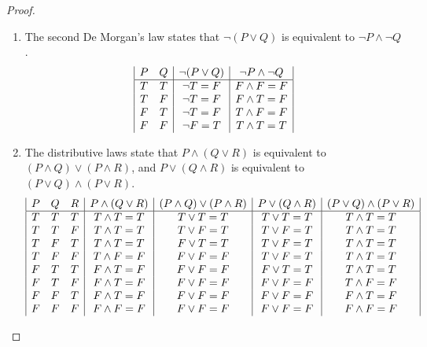 \documentclass[12pt]{amsart}
\theoremstyle{definition}
\theoremstyle{remark}
\begin{document}
\begin{proof}
\hfill
\begin{enumerate}
	\item The second De Morgan's law states that $\neg (P \vee Q)$ is equivalent to $\neg P \wedge \neg Q$.
	\begin{equation*}
		\begin{array}{| c c | c | c |}
			P & Q & \neg (P \vee Q) & \neg P \wedge \neg Q \\
			\hline
			T & T & \neg T = F & F \wedge F = F \\
			T & F & \neg T = F & F \wedge T = F \\
			F & T & \neg T = F & T \wedge F = F \\
			F & F & \neg F = T & T \wedge T = T
		\end{array}
	\end{equation*}
	
	\item The distributive laws state that $P \wedge (Q \vee R)$ is equivalent to $(P \wedge Q) \vee (P \wedge R)$, and $P \vee (Q \wedge R)$ is equivalent to $(P \vee Q) \wedge (P \vee R)$.
	\begin{equation*}
		\begin{array}{| c c c | c | c | c | c |}
			P & Q & R & P \wedge (Q \vee R) & (P \wedge Q) \vee (P \wedge R)
			& P \vee (Q \wedge R) & (P \vee Q) \wedge (P \vee R) \\
			\hline
			T & T & T & T \wedge T = T & T \vee T = T & T \vee T = T & T \wedge T = T \\
			T & T & F & T \wedge T = T & T \vee F = T & T \vee F = T & T \wedge T = T \\
			T & F & T & T \wedge T = T & F \vee T = T & T \vee F = T & T \wedge T = T \\
			T & F & F & T \wedge F = F & F \vee F = F & T \vee F = T & T \wedge T = T \\
			F & T & T & F \wedge T = F & F \vee F = F & F \vee T = T & T \wedge T = T \\
			F & T & F & F \wedge T = F & F \vee F = F & F \vee F = F & T \wedge F = F \\
			F & F & T & F \wedge T = F & F \vee F = F & F \vee F = F & F \wedge T = F \\
			F & F & F & F \wedge F = F & F \vee F = F & F \vee F = F & F \wedge F = F
		\end{array}
	\end{equation*}
\end{enumerate}
\end{proof}
\end{document}
